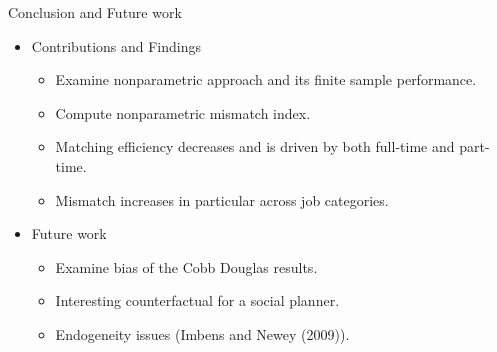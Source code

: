 \documentclass[aspectratio=169]{beamer}
\begin{document}
\begin{frame}{Conclusion and Future work}
    \begin{itemize}
      \item Contributions and Findings
      \begin{itemize}
          \item Examine nonparametric approach and its finite sample performance.
          \item Compute nonparametric mismatch index.
          \item Matching efficiency decreases and is driven by both full-time and part-time.
          \item Mismatch increases in particular across job categories.
      \end{itemize}
      \item Future work
      \begin{itemize}
          \item Examine bias of the Cobb Douglas results.
          \item Interesting counterfactual for a social planner.
          \item Endogeneity issues (Imbens and Newey (2009)).
      \end{itemize}
    \end{itemize}
\end{frame}
\end{document}
